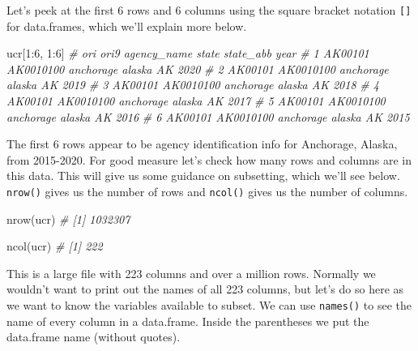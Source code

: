 \documentclass[
  a4paper,
]{krantz}
\makeatletter
\newenvironment{Shaded}{\begin{snugshade}}{\end{snugshade}}
\newcommand{\CommentTok}[1]{\textcolor[rgb]{0.37,0.37,0.37}{\textit{#1}}}
\newcommand{\DecValTok}[1]{\textcolor[rgb]{0.06,0.06,0.06}{#1}}
\newcommand{\FunctionTok}[1]{\textcolor[rgb]{0,0,0}{#1}}
\newcommand{\NormalTok}[1]{#1}
\newcommand{\SpecialCharTok}[1]{\textcolor[rgb]{0,0,0}{#1}}
\newenvironment{kframe}{%
\medskip{}
\setlength{\fboxsep}{.8em}
 \def\at@end@of@kframe{}%
 \ifinner\ifhmode%
  \def\at@end@of@kframe{\end{minipage}}%
  \begin{minipage}{\columnwidth}%
 \fi\fi%
 \def\FrameCommand##1{\hskip\@totalleftmargin \hskip-\fboxsep
 \colorbox{shadecolor}{##1}\hskip-\fboxsep
     \hskip-\linewidth \hskip-\@totalleftmargin \hskip\columnwidth}%
 \MakeFramed {\advance\hsize-\width
   \@totalleftmargin\z@ \linewidth\hsize
   \@setminipage}}%
 {\par\unskip\endMakeFramed%
 \at@end@of@kframe}
\renewenvironment{Shaded}{\begin{kframe}}{\end{kframe}}
\makeatother
\begin{document}
Let's peek at the first 6 rows and 6 columns using the
square bracket notation \texttt{{[}{]}} for data.frames,
which we'll explain more below.

\begin{Shaded}
\begin{Highlighting}[]
\NormalTok{ucr[}\DecValTok{1}\SpecialCharTok{:}\DecValTok{6}\NormalTok{, }\DecValTok{1}\SpecialCharTok{:}\DecValTok{6}\NormalTok{]}
\CommentTok{\#       ori      ori9 agency\_name  state state\_abb year}
\CommentTok{\# 1 AK00101 AK0010100   anchorage alaska        AK 2020}
\CommentTok{\# 2 AK00101 AK0010100   anchorage alaska        AK 2019}
\CommentTok{\# 3 AK00101 AK0010100   anchorage alaska        AK 2018}
\CommentTok{\# 4 AK00101 AK0010100   anchorage alaska        AK 2017}
\CommentTok{\# 5 AK00101 AK0010100   anchorage alaska        AK 2016}
\CommentTok{\# 6 AK00101 AK0010100   anchorage alaska        AK 2015}
\end{Highlighting}
\end{Shaded}

The first 6 rows appear to be agency identification info for
Anchorage, Alaska, from 2015-2020. For good measure let's
check how many rows and columns are in this data. This will
give us some guidance on subsetting, which we'll see below.
\texttt{nrow()} gives us the number of rows and
\texttt{ncol()} gives us the number of columns.

\begin{Shaded}
\begin{Highlighting}[]
\FunctionTok{nrow}\NormalTok{(ucr)}
\CommentTok{\# [1] 1032307}
\end{Highlighting}
\end{Shaded}

\begin{Shaded}
\begin{Highlighting}[]
\FunctionTok{ncol}\NormalTok{(ucr)}
\CommentTok{\# [1] 222}
\end{Highlighting}
\end{Shaded}

This is a large file with 223 columns and over a million
rows. Normally we wouldn't want to print out the names of
all 223 columns, but let's do so here as we want to know the
variables available to subset. We can use \texttt{names()}
to see the name of every column in a data.frame. Inside the
parentheses we put the data.frame name (without quotes).
\end{document}
